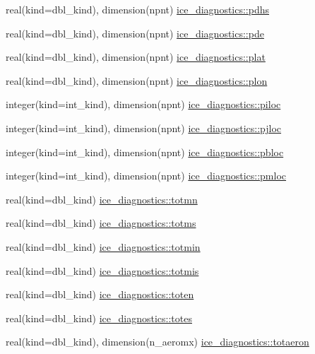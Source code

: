 \begin{DoxyCompactItemize}
\item 
real(kind=dbl\_\-kind), dimension(npnt) \hyperlink{namespaceice__diagnostics_aafb0c3e7a68ebfdd564e56305618c799}{ice\_\-diagnostics::pdhs}
\item 
real(kind=dbl\_\-kind), dimension(npnt) \hyperlink{namespaceice__diagnostics_afaeca519ef7de2238cb47f6f1b6c3032}{ice\_\-diagnostics::pde}
\item 
real(kind=dbl\_\-kind), dimension(npnt) \hyperlink{namespaceice__diagnostics_a463e02d524db51f3b7cfe43b74753ea7}{ice\_\-diagnostics::plat}
\item 
real(kind=dbl\_\-kind), dimension(npnt) \hyperlink{namespaceice__diagnostics_a19e637460f07e8d9b9b9973903ec467a}{ice\_\-diagnostics::plon}
\item 
integer(kind=int\_\-kind), dimension(npnt) \hyperlink{namespaceice__diagnostics_a1b77eb5ad27f3307cbff090ad8011f0a}{ice\_\-diagnostics::piloc}
\item 
integer(kind=int\_\-kind), dimension(npnt) \hyperlink{namespaceice__diagnostics_a6ba83151bf36d6683bf55801185296ca}{ice\_\-diagnostics::pjloc}
\item 
integer(kind=int\_\-kind), dimension(npnt) \hyperlink{namespaceice__diagnostics_afb89b35222316a961a8e669d4c3a8e9a}{ice\_\-diagnostics::pbloc}
\item 
integer(kind=int\_\-kind), dimension(npnt) \hyperlink{namespaceice__diagnostics_a265877fbf85570a11a36cee45d4b1044}{ice\_\-diagnostics::pmloc}
\item 
real(kind=dbl\_\-kind) \hyperlink{namespaceice__diagnostics_a07a894a84b541e5cdb03c7b30cfa6bdd}{ice\_\-diagnostics::totmn}
\item 
real(kind=dbl\_\-kind) \hyperlink{namespaceice__diagnostics_abdb06061e5db5f354797848bbd36dbb2}{ice\_\-diagnostics::totms}
\item 
real(kind=dbl\_\-kind) \hyperlink{namespaceice__diagnostics_a810e9254a399aaee3f3bc9f45fda5616}{ice\_\-diagnostics::totmin}
\item 
real(kind=dbl\_\-kind) \hyperlink{namespaceice__diagnostics_a34eaaab8fe90658931ee055c55fa4ef6}{ice\_\-diagnostics::totmis}
\item 
real(kind=dbl\_\-kind) \hyperlink{namespaceice__diagnostics_a2ca0dd7abee30b5f5efc72fc53a8e1a2}{ice\_\-diagnostics::toten}
\item 
real(kind=dbl\_\-kind) \hyperlink{namespaceice__diagnostics_ae008664e2d6b21a926cf781260b3c251}{ice\_\-diagnostics::totes}
\item 
real(kind=dbl\_\-kind), dimension(n\_\-aeromx) \hyperlink{namespaceice__diagnostics_ae86e38feca7ea19893e632dd3ff7a5a9}{ice\_\-diagnostics::totaeron}

\end{DoxyCompactItemize}
